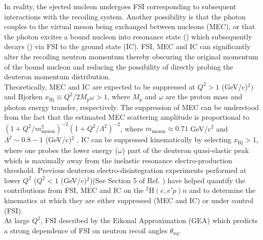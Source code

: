 \indent In reality, the ejected nucleon undergoes FSI corresponding to subsequent interactions with the recoiling system. Another possibility is that the
photon couples to the virtual meson being exchanged between nucleons (MEC), or that the photon excites a bound nucleon into \DIFdelbegin {}\DIFdelend \DIFaddbegin {}\DIFaddend resonance state (\DIFdelbegin {}\DIFdelend \DIFaddbegin \DIFadd{$\Delta$}\DIFaddend ) which subsequently
decays (\DIFdelbegin {}\DIFdelend \DIFaddbegin {}\DIFaddend ) via FSI to the ground state (IC).  FSI, MEC and IC can significantly alter the recoiling neutron
momentum thereby obscuring the original momentum of the bound nucleon and reducing the possibility of directly probing the deuteron momentum distribution. \\
\indent Theoretically, MEC and IC are expected to be suppressed at $Q^{2}>1$ (GeV/c)$^{2})$ and Bjorken $x_{\mathrm{Bj}}\equiv Q^{2}/2M_{p}\omega>1$, where $M_{p}$ and $\omega$ are the proton mass and photon energy transfer, respectively\DIFaddbegin {}\DIFaddend .
The suppression of MEC can be understood from the fact that the estimated MEC scattering amplitude is proportional to  $(1 + Q^{2}/m^{2}_{\mathrm{meson}})^{-2}(1+Q^{2}/\Lambda^{2})^{-2}$, where $m_{\mathrm{meson}}\approx0.71$ GeV/c$^{2}$ and
$\Lambda^{2}\sim 0.8-1 $ (GeV/c)$^{2}$ \cite{Sargsian_2001}. IC can be suppressed kinematically by selecting $x_{\mathrm{Bj}}>1$, where one probes the lower energy ($\omega$) part of the deuteron quasi-elastic peak which is maximally \DIFdelbegin {}\DIFdelend away from the inelastic resonance
electro-production threshold. Previous deuteron electro-disintegration experiments performed at lower $Q^{2}$ ($Q^{2}<1$ (GeV/c)$^{2}$)(See Section 5 of Ref. \cite{sargsian_2015}) have helped quantify the contributions
from FSI, MEC and IC on the $^{2}\mathrm{H}(e,e'p)n$ \DIFdelbegin {}\DIFdelend \DIFaddbegin {}\DIFaddend and to determine the kinematics at which they are either suppressed (MEC and IC) or under control (FSI).  \\
\indent At large $Q^{2}$, FSI \DIFdelbegin {}\DIFdelend \DIFaddbegin {}\DIFaddend described by the \DIFdelbegin {}\DIFdelend \DIFaddbegin {}\DIFaddend Eikonal Approximation (GEA) \cite{Sargsian_2001,PhysRevC.56.1124,sargsian_2015}\DIFaddbegin \DIFadd{, }\DIFaddend which predicts a strong dependence of FSI on neutron recoil angles $\theta_{nq}$.
